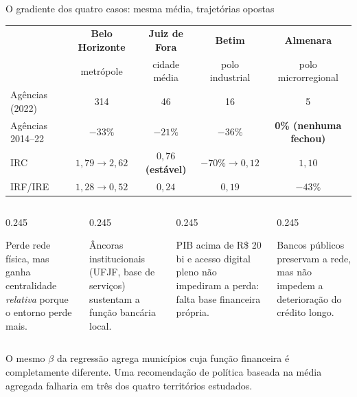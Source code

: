 \documentclass[aspectratio=169,10pt]{beamer}
\newcommand{\dest}[1]{\textcolor{cedlaranja}{\textbf{#1}}}
\newcommand{\pos}[1]{\textcolor{cedverde}{\textbf{#1}}}
\begin{document}
\begin{frame}{O gradiente dos quatro casos: mesma média, trajetórias opostas}
  \centering
  \small
  \begin{tabular}{@{}lcccc@{}}
    \toprule
    & \textbf{Belo Horizonte} & \textbf{Juiz de Fora} & \textbf{Betim} &
      \textbf{Almenara}\\
    & {\scriptsize metrópole} & {\scriptsize cidade média} &
      {\scriptsize polo industrial} & {\scriptsize polo microrregional}\\
    \midrule
    Agências (2022)      & 314 & 46 & 16 & 5\\
    Agências 2014--22    & \dest{$-33\%$} & \pos{$-21\%$} & \dest{$-36\%$} &
      \pos{0\% (nenhuma fechou)}\\
    IRC                  & \pos{$1{,}79 \to 2{,}62$} & \pos{$0{,}76$ (estável)} &
      \dest{$-70\% \to 0{,}12$} & \pos{$1{,}10$}\\
    IRF/IRE              & \dest{$1{,}28 \to 0{,}52$} & $0{,}24$ & $0{,}19$ &
      \dest{$-43\%$}\\
    \bottomrule
  \end{tabular}

  \vspace{0.8em}
  \begin{columns}[T]
    \begin{column}{0.245\textwidth}
      \begin{block}{}\scriptsize Perde rede física, mas ganha centralidade
        \emph{relativa} porque o entorno perde mais.\end{block}
    \end{column}
    \begin{column}{0.245\textwidth}
      \begin{block}{}\scriptsize Âncoras institucionais (UFJF, base de serviços)
        sustentam a função bancária local.\end{block}
    \end{column}
    \begin{column}{0.245\textwidth}
      \begin{block}{}\scriptsize PIB acima de R\$ 20 bi e acesso digital pleno não
        impediram a perda: falta base financeira própria.\end{block}
    \end{column}
    \begin{column}{0.245\textwidth}
      \begin{block}{}\scriptsize Bancos públicos preservam a rede, mas não impedem
        a deterioração do crédito longo.\end{block}
    \end{column}
  \end{columns}

  \vspace{0.6em}
  \begin{alertblock}{}
    \small O mesmo $\beta$ da regressão agrega municípios cuja função financeira é
    completamente diferente. Uma recomendação de política baseada na média agregada
    falharia em três dos quatro territórios estudados.
  \end{alertblock}
\end{frame}
\end{document}
